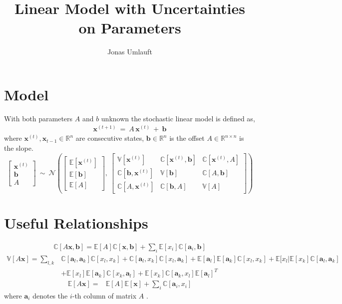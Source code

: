 \documentclass{article}
\title{Linear Model with Uncertainties on Parameters}
\author{Jonas Umlauft}
\newcommand{\vct}{\boldsymbol}
\newcommand{\E}{\mathbb E}
\newcommand{\V}{\mathbb V}
\newcommand{\C}{\mathbb C}
\newcommand{\N}{\mathcal N}
\begin{document}
\maketitle
\section{Model}
With both parameters $A$ and $b$ unknown the stochastic linear model is defined as,
\begin{align}
\vct{x}^{(t+1)}\ =\ A\,\vct{x}^{(t)}\ +\ \vct{b}
\label{mod}
\end{align}
where $\vct{x}^{(t)}, \vct{x}_{t-1} \in \mathbb{R}^n$ are consecutive states, $\vct{b} \in \mathbb{R}^n$ is the offset $A\in \mathbb{R}^{n \times n}$ is the slope. 
\begin{equation}
	\left[\begin{array}{c} \vct{x}^{(t)} \\  \vct{b} \\ A  \end{array} \right]
	\ \sim\ 
	\N\left( 
		\left[\begin{array}{c} \E[\vct{x}^{(t)}]  \\ \E[\vct{b}] \\ \E[A] \end{array}\right],\  
	\left[\begin{array}{ccc}  \V[\vct{x}^{(t)}]                &  \C[\vct{x}^{(t)},\vct{b}]   & \C[\vct{x}^{(t)},A]  \\
                              \C[\vct{b}, \vct{x}^{(t)}]       & \V[\vct{b}]                   &  \C[A, \vct{b}]      
                              \\ \C[A,\vct{x}^{(t)}]            & \C[\vct{b},A]                  & \V[A]
	\end{array}\right]\right)
\end{equation}
\section{Useful Relationships}
\begin{align}
\C[A\vct{x},\vct{b}] = \E[A]\C[\vct{x},\vct{b}] + \sum_i \E[x_i] \C[\vct{a}_i,\vct{b}]
\end{align}
\begin{align}
\V[A\vct{x}]    =  \sum_{l,k} & \C[\vct{a}_l,\vct{a}_k]\C[x_l,x_k]    + \C[\vct{a}_l,x_k]\C[x_l,\vct{a}_k]   + \E[\vct{a}_l] \E[\vct{a}_k] \C[x_l,x_k]   +   \E[x_l| \E[x_k] \C[\vct{a}_l,\vct{a}_k] \\
                               &+   \E[x_l] \E[\vct{a}_k] \C[x_k,\vct{a}_l]  +   \E[x_k]  \C[\vct{a}_k, x_l ] \E[\vct{a}_l]^T 
\end{align}
\begin{align}          
\E[A\vct{x}] = &\E[A]\E[\vct{x}] + \sum_i \C[\vct{a}_i, x_i]
\end{align}
where $\vct{a}_i$ denotes the $i$-th column of matrix $A$ .
\end{document}
